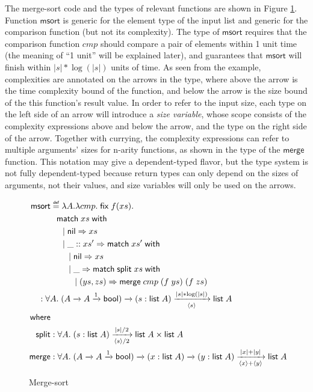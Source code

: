 \documentclass[preprint]{sigplanconf}
\newcommand{\arrow}[4]{#1\xrightarrow[#3]{#2}#4}
\newcommand{\symmatch}{\mathsf{match}}
\newcommand{\symwith}{\mathsf{\;with\;}}
\newcommand{\symlist}{\mathsf{list}}
\newcommand{\symnil}{\mathsf{nil}}
\newcommand{\symfix}{\mathsf{fix}}
\newcommand{\symbool}{\mathsf{bool}}
\newcommand{\symmerge}{\mathsf{merge}}
\newcommand{\intro}[2]{(#1 : #2)}
\newcommand{\symmsort}{\mathsf{msort}}
\newcommand{\symsplit}{\mathsf{split}}
\newcommand\defeq{\mathrel{\overset{\makebox[0pt]{\mbox{\normalfont\tiny\sffamily def}}}{=}}}
\newcommand{\Sstats}[1]{\left \langle #1 \right \rangle}
\begin{document}
The merge-sort code and the types of relevant functions are shown in Figure \ref{msort}. Function $\symmsort$ is generic for the element type of the input list and generic for the comparison function (but not its complexity). The type of $\symmsort$ requires that the comparison function $cmp$ should compare a pair of elements within 1 unit time (the meaning of ``1 unit'' will be explained later), and guarantees that $\symmsort$ will finish within $|s|*\log(|s|)$ units of time. As seen from the example, complexities are annotated on the arrows in the type, where above the arrow is the time complexity bound of the function, and below the arrow is the size bound of the this function's result value. In order to refer to the input size, each type on the left side of an arrow will introduce a \emph{size variable}, whose scope consists of the complexity expressions above and below the arrow, and the type on the right side of the arrow. Together with currying, the complexity expressions can refer to multiple arguments' sizes for n-arity functions, as shown in the type of the $\symmerge$ function. This notation may give a dependent-typed flavor, but the type system is not fully dependent-typed because return types can only depend on the sizes of arguments, not their values, and size variables will only be used on the arrows.

\begin{figure}
\begin{align*}
\symmsort &\defeq \lambda A. \lambda cmp.\;\symfix\;f(xs). \\
& \hspace{.1in} \symmatch\;xs\symwith \\
& \hspace{.2in} |\; \symnil\Rightarrow xs \\
& \hspace{.2in} |\; \_::xs' \Rightarrow \symmatch\;xs'\symwith \\
& \hspace{.3in} |\; \symnil\Rightarrow xs \\
& \hspace{.3in} |\; \_ \Rightarrow \symmatch\; \symsplit\;xs \symwith \\
& \hspace{.4in} |\; (ys, zs) \Rightarrow \symmerge\;cmp\;(f\;ys)\;(f\;zs) \\
& \hspace{-0.2in} : \forall A.\;\arrow{(\arrow{A}{}{}{\arrow{A}{1}{}{\symbool}})}{}{}{\arrow{\intro{s}{\symlist\;A}}{|s|*\log(|s|)}{\Sstats{s}}{\symlist\;A}} \\
\mathsf{where} & \\
\symsplit &: \forall A.\;\arrow{\intro{s}{\symlist\;A}}{|s|/2}{\Sstats{s}/2}{\symlist\;A\times\symlist\;A} \\
\symmerge &: \forall A.\;\arrow{(\arrow{A}{}{}{\arrow{A}{1}{}{\symbool}})}{}{}{\arrow{\intro{x}{\symlist\;A}}{}{}{\arrow{\intro{y}{\symlist\;A}}{|x|+|y|}{\Sstats{x}+\Sstats{y}}{\symlist\;A}}}
\end{align*}
\caption{\label{msort}Merge-sort}
\end{figure}
\end{document}
